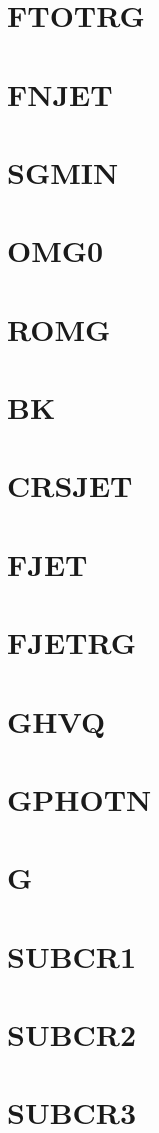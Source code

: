 \documentclass[10pt,UTF8]{ctexbook}
\begin{document}
\section{FTOTRG}
\section{FNJET}
\section{SGMIN}
\section{OMG0}
\section{ROMG}
\section{BK}
\section{CRSJET}
\section{FJET}
\section{FJETRG}
\section{GHVQ}
\section{GPHOTN}
\section{G}
\section{SUBCR1}
\section{SUBCR2}
\section{SUBCR3}
\end{document}
